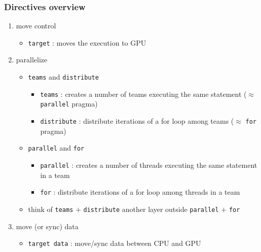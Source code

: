 \documentclass[12pt,dvipdfmx]{beamer}
\newcommand{\ao}[1]{{\color{blue}#1}}
\begin{document}

\begin{frame}
  \frametitle{Directives overview}
  \begin{enumerate}
  \item move control
    \begin{itemize}
    \item \ao{\tt target} : moves the execution to GPU
    \end{itemize}
  \item parallelize
    \begin{itemize}
    \item \ao{\tt teams} and \ao{\tt distribute}
      \begin{itemize}
      \item \ao{\tt teams} : creates a number of teams executing the same statement
        ($\approx$ {\tt parallel} pragma)
      \item \ao{\tt distribute} : distribute iterations of a for loop among teams
        ($\approx$ {\tt for} pragma)
      \end{itemize}
    \item \ao{\tt parallel} and \ao{\tt for}
      \begin{itemize}
      \item \ao{\tt parallel} : creates a number of threads
        executing the same statement in a team
      \item \ao{\tt for} : distribute iterations of a for loop among threads
        in a team
      \end{itemize}
    \item think of \ao{\tt teams} $+$ \ao{\tt distribute} another layer
      outside \ao{\tt parallel} $+$ \ao{\tt for}
    \end{itemize}
  \item move (or sync) data
    \begin{itemize}
    \item \ao{\tt target data} : move/sync data between CPU and GPU
    \end{itemize}
  \end{enumerate}
\end{frame}
\end{document}
